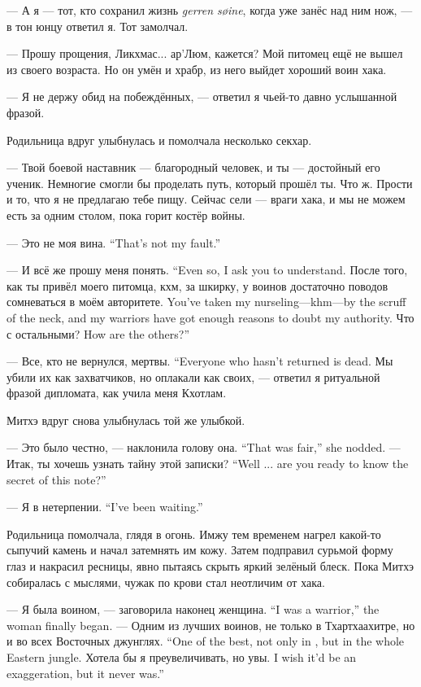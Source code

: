 --- А я --- тот, кто сохранил жизнь \textit{gerren s\o{}ine}, когда уже занёс над ним нож, --- в тон юнцу ответил я.
Тот замолчал.

--- Прошу прощения, Ликхмас... ар’Люм, кажется?
Мой питомец ещё не вышел из своего возраста.
Но он умён и храбр, из него выйдет хороший воин хака.

--- Я не держу обид на побеждённых, --- ответил я чьей-то давно услышанной фразой.

Родильница вдруг улыбнулась и помолчала несколько секхар.

--- Твой боевой наставник --- благородный человек, и ты --- достойный его ученик.
Немногие смогли бы проделать путь, который прошёл ты.
Что ж.
Прости и то, что я не предлагаю тебе пищу.
Сейчас сели --- враги хака, и мы не можем есть за одним столом, пока горит костёр войны.

{--- Это не моя вина.}
{``That's not my fault.''}

{--- И всё же прошу меня понять.}
{``Even so, I ask you to understand.}
{После того, как ты привёл моего питомца, кхм, за шкирку, у воинов достаточно поводов сомневаться в моём авторитете.}
{You've taken my nurseling---khm---by the scruff of the neck, and my warriors have got enough reasons to doubt my authority.}
{Что с остальными?}
{How are the others?''}

{--- Все, кто не вернулся, мертвы.}
{``Everyone who hasn't returned is dead. }
Мы убили их как захватчиков, но оплакали как своих, --- ответил я ритуальной фразой дипломата, как учила меня Кхотлам.

Митхэ вдруг снова улыбнулась той же улыбкой.

{--- Это было честно, --- наклонила голову она.}
{``That was fair,'' she nodded.}
{--- Итак, ты хочешь узнать тайну этой записки?}
{``Well ... are you ready to know the secret of this note?''}

{--- Я в нетерпении.}
{``I've been waiting.''}

Родильница помолчала, глядя в огонь.
Имжу тем временем нагрел какой-то сыпучий камень и начал затемнять им кожу.
Затем подправил сурьмой форму глаз и накрасил ресницы, явно пытаясь скрыть яркий зелёный блеск.
Пока Митхэ собиралась с мыслями, чужак по крови стал неотличим от хака.

{--- Я была воином, --- заговорила наконец женщина.}
{``I was a warrior,'' the woman finally began.}
{--- Одним из лучших воинов, не только в Тхартхаахитре, но и во всех Восточных джунглях.}
{``One of the best, not only in \Tchartchaahitr, but in the whole Eastern jungle.}
{Хотела бы я преувеличивать, но увы.}
{I wish it'd be an exaggeration, but it never was.''}

